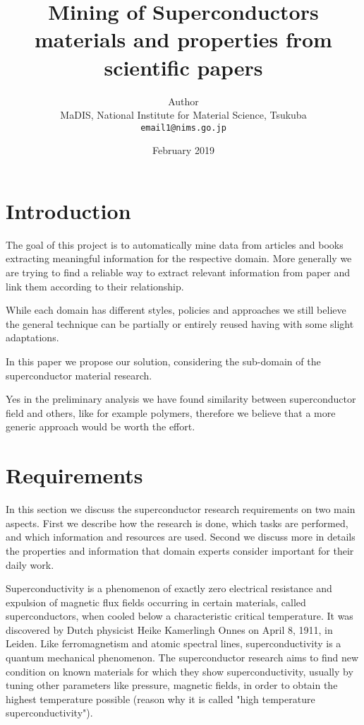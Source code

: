 \documentclass{article}
\title{Mining of Superconductors materials and properties from scientific papers}
\author{
  Author\\
  MaDIS, National Institute for Material Science, Tsukuba\\
  \texttt{email1@nims.go.jp}
}
\date{February 2019}
\begin{document}
\maketitle

\tableofcontents

\pagebreak

\section{Introduction}

The goal of this project is to automatically mine data from articles and books extracting meaningful information for the respective domain. More generally we are trying to find a reliable way to extract relevant information from paper and link them according to their relationship. 

While each domain has different styles, policies and approaches we still believe the general technique can be partially or entirely reused having with some slight adaptations. 

In this paper we propose our solution, considering the sub-domain of the superconductor material research. 

Yes in the preliminary analysis we have found similarity between superconductor field and others, like for example polymers, therefore we believe that a more generic approach would be worth the effort. 


\section{Requirements}

In this section we discuss the superconductor research requirements on two main aspects. First we describe how the research is done, which tasks are performed, and which information and resources are used. Second we discuss more in details the properties and information that domain experts consider important for their daily work. 

Superconductivity is a phenomenon of exactly zero electrical resistance and expulsion of magnetic flux fields occurring in certain materials, called superconductors, when cooled below a characteristic critical temperature. It was discovered by Dutch physicist Heike Kamerlingh Onnes on April 8, 1911, in Leiden. Like ferromagnetism and atomic spectral lines, superconductivity is a quantum mechanical phenomenon.
The superconductor research aims to find new condition on known materials for which they show superconductivity, usually by tuning other parameters like pressure, magnetic fields, in order to obtain the highest temperature possible (reason why it is called "high temperature superconductivity"). 
\end{document}
